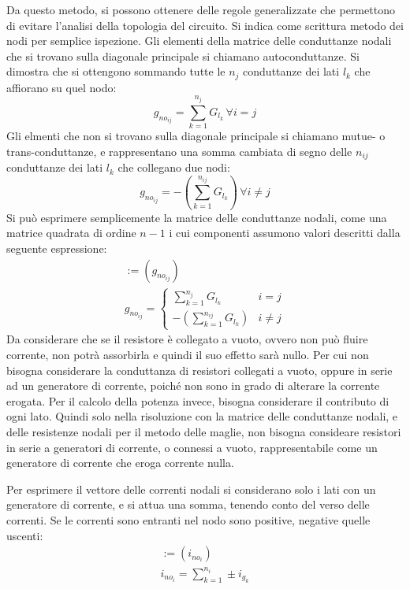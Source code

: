 \documentclass{article}
\numberwithin{equation}{subsection}
\begin{document}
Da questo metodo, si possono ottenere delle regole generalizzate che permettono di evitare l'analisi della topologia del circuito. Si indica come scrittura metodo dei nodi 
per semplice ispezione. Gli elementi della matrice delle conduttanze nodali che si trovano sulla diagonale principale si chiamano autoconduttanze. Si dimostra che si ottengono 
sommando tutte le $n_{j}$ conduttanze dei lati $l_k$ che affiorano su quel nodo:
\begin{equation*}
    g_{{no}_{ij}}=\displaystyle\sum_{k=1}^{n_j}G_{l_k}\,\forall i= j
\end{equation*}
Gli elmenti che non si trovano sulla diagonale principale si chiamano mutue- o trans-conduttanze, e rappresentano una somma cambiata di segno delle $n_{ij}$ conduttanze dei lati 
$l_k$ che collegano due nodi:
\begin{equation*}
    g_{{no}_{ij}}=-\displaystyle\left(\sum_{k=1}^{n_{ij}}G_{l_k}\right)\,\forall i\neq j
\end{equation*}
Si può esprimere semplicemente la matrice delle conduttanze nodali, come una matrice quadrata di ordine $n-1$ i cui componenti assumono valori descritti dalla seguente 
espressione: 
\begin{gather*}
    [G_{no}]:=(g_{{no}_{ij}})\\
    g_{{no}_{ij}}=\begin{cases}
        \displaystyle\sum_{k=1}^{n_j}G_{l_k} &i=j\\
        -\displaystyle\left(\sum_{k=1}^{n_{ij}}G_{l_k}\right)&i\neq j
    \end{cases}
\end{gather*}
Da considerare che se il resistore è collegato a vuoto, ovvero non può fluire corrente, non potrà assorbirla e quindi il suo effetto sarà nullo. Per cui non bisogna considerare 
la conduttanza di resistori collegati a vuoto, oppure in serie ad un generatore di corrente, poiché non sono in grado di alterare la corrente erogata. Per il calcolo della potenza 
invece, bisogna considerare il contributo di ogni lato. Quindi solo nella risoluzione con la matrice delle conduttanze nodali, e delle resistenze nodali per il metodo 
delle maglie, non bisogna consideare resistori in serie a generatori di corrente, o connessi a vuoto, rappresentabile come un generatore di corrente che eroga corrente nulla. 


Per esprimere il vettore delle correnti nodali si considerano solo i lati con un generatore di corrente, e si attua una somma, tenendo conto del verso delle correnti. 
Se le correnti sono entranti nel nodo sono positive, negative quelle uscenti: 
\begin{gather*}
    [I_{no}]:=(i_{{no}_{i}})\\
    i_{{no}_i}=\displaystyle\sum_{k=1}^{n_i}\pm i_{g_k}
\end{gather*}
\end{document}
